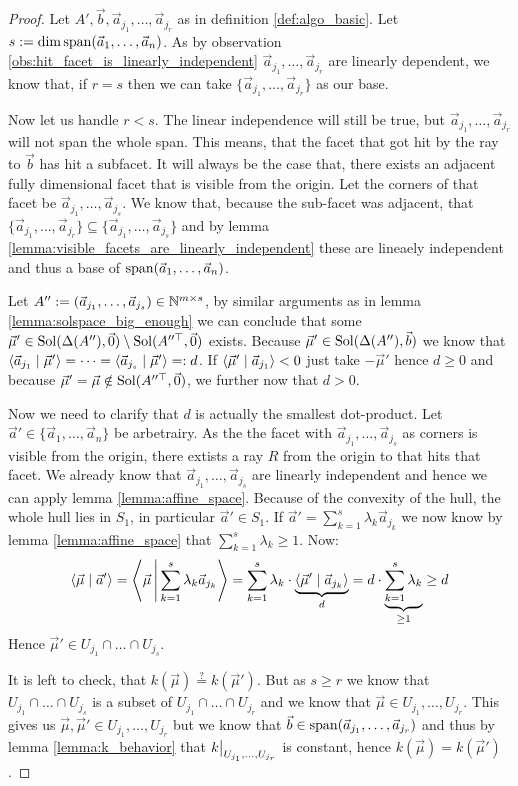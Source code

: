 \begin{proof}
    Let $A', \vec b, \vec a_{j_1}, \dots, \vec a_{j_r}$ as in definition \ref{def:algo_basic}. Let $s := \dim\operatorname{span}(\vec a_1, \dots, \vec a_n)$. As by observation \ref{obs:hit_facet_is_linearly_independent} $\vec a_{j_1}, \dots, \vec a_{j_r}$ are linearly dependent, we know that, if $r = s$ then we can take $\{\vec a_{j_1}, \dots, \vec a_{j_r}\}$ as our base.
    
    Now let us handle $r < s$. The linear independence will still be true, but $\vec a_{j_1}, \dots, \vec a_{j_r}$ will not span the whole span. This means, that the facet that got hit by the ray to $\vec b$ has hit a subfacet. It will always be the case that, there exists an adjacent fully dimensional facet that is visible from the origin. Let the corners of that facet be $\vec a_{j_1}, \dots, \vec a_{j_s}$. We know that, because the sub-facet was adjacent, that $\{\vec a_{j_1}, \dots, \vec a_{j_r}\} \subseteq \{\vec a_{j_1}, \dots, \vec a_{j_s}\}$ and by lemma \ref{lemma:visible_facets_are_linearly_independent} these are lineaely independent and thus a base of $\operatorname{span}(\vec a_1, \dots, \vec a_n)$. 

    Let $A'' := (\vec a_{j_1}, \dots, \vec a_{j_s}) \in \mathbb{N}^{m\times s}$, by similar arguments as in lemma \ref{lemma:solspace_big_enough} we can conclude that some $\vec\mu' \in \operatorname{Sol}(\Delta(A''), \vec 0) \setminus \operatorname{Sol}(A''^\top, \vec 0)$ exists. Because $\vec\mu' \in \operatorname{Sol}(\Delta(A''), \vec b)$ we know that $\langle \vec a_{j_1} \mid \vec\mu' \rangle = \dots = \langle \vec a_{j_s} \mid \vec\mu' \rangle =: d$. If $\langle \vec\mu' \mid \vec a_{j_1} \rangle < 0$ just take $-\vec\mu'$ hence $d \geq 0$ and because $\vec\mu' = \vec\mu \notin \operatorname{Sol}(A''^\top, \vec 0)$, we further now that $d > 0$.

    Now we need to clarify that $d$ is actually the smallest dot-product. Let $\vec a' \in \{\vec a_1, \dots, \vec a_n\}$ be arbetrairy. As the the facet with $\vec a_{j_1}, \dots, \vec a_{j_s}$ as corners is visible from the origin, there extists a ray $R$ from the origin to that hits that facet. We already know that $\vec a_{j_1}, \dots, \vec a_{j_s}$ are linearly independent and hence we can apply lemma \ref{lemma:affine_space}. Because of the convexity of the hull, the whole hull lies in $S_1$, in particular $\vec a' \in S_1$. If $\vec a' = \sum_{k=1}^s \lambda_k \vec a_{j_k}$ we now know by lemma \ref{lemma:affine_space} that $\sum_{k=1}^s \lambda_k \geq 1$. Now:
    $$\langle \vec\mu \mid \vec a' \rangle = \left\langle \vec\mu \,\middle|\, \sum_{k=1}^s \lambda_k \vec a_{j_k} \right\rangle = \sum_{k=1}^s\lambda_k \cdot \underbrace{\langle \vec\mu' \mid \vec a_{j_k} \rangle}_d = d\cdot \underbrace{\sum_{k=1}^s\lambda_k}_{\geq 1} \geq d$$
    Hence $\vec\mu' \in U_{j_1} \cap \dots \cap U_{j_s}$. 
    
    It is left to check, that $k(\vec\mu) \stackrel{?}{=} k(\vec\mu')$. But as $s \geq r$ we know that $U_{j_1} \cap \dots \cap U_{j_s}$ is a subset of $U_{j_1} \cap \dots \cap U_{j_r}$ and we know that $\vec\mu \in U_{j_1}, \dots, U_{j_r}$. This gives us $\vec\mu, \vec\mu' \in U_{j_1}, \dots, U_{j_r}$ but we know that $\vec b \in \operatorname{span}(\vec a_{j_1}, \dots, \vec a_{j_r})$ and thus by lemma \ref{lemma:k_behavior} that $\restrict{k}{U_{j_1}, \dots, U_{j_r}}$ is constant, hence $k(\vec\mu) = k(\vec\mu')$.
\end{proof}
